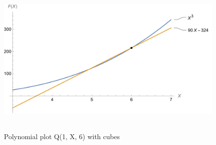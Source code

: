 ﻿\begin{figure}[H]
    \centering
    \includegraphics[width=1\textwidth]{sections/images/02_plots_polynomial_q1_n6_with_cubes}
    ~\caption{Polynomial plot Q(1, X, 6) with cubes}\label{fig:figure8}
\end{figure}
